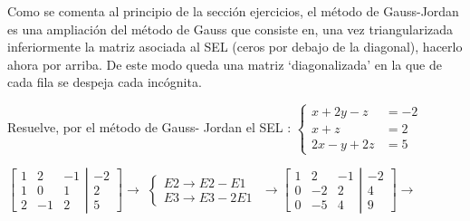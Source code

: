 \begin{ejre} 
Como se comenta al principio de la sección ejercicios, el método de Gauss-Jordan es una ampliación del método de Gauss que consiste en, una vez triangularizada inferiormente la matriz asociada al SEL (ceros por debajo de la diagonal), hacerlo ahora por arriba. De este modo queda una matriz `diagonalizada' en la que de cada fila se despeja cada incógnita.

\noindent Resuelve, por el método de Gauss- Jordan el SEL : $\begin{cases}  x+2y-z&=-2 \\ x+z&=2 \\ 2x-y+2z&=5\end{cases}$
\end{ejre}
\begin{proofw}\renewcommand{\qedsymbol}{$\diamond$}

$\left[ \begin{matrix}
  1 & 2 & -1 \\ 1 & 0 & 1 \\ 2 & -1 & 2 
 \end{matrix}\right. 
 \left| \begin{matrix}
  -2 \\ 2 \\ 5  
 \end{matrix}\right] \to  $
 \textcolor{gris}{$\begin{cases}E2 \to E2-E1 \\ E3 \to E3-2 E1 \end{cases} $}
 $ \to \left[ \begin{matrix}
  1 & 2 & -1 \\ 0 & -2 & 2 \\ 0 & -5 & 4 
 \end{matrix}\right. 
 \left| \begin{matrix}
  -2 \\ 4 \\ 9  
 \end{matrix}\right] \to$
 

\end{proofw}
